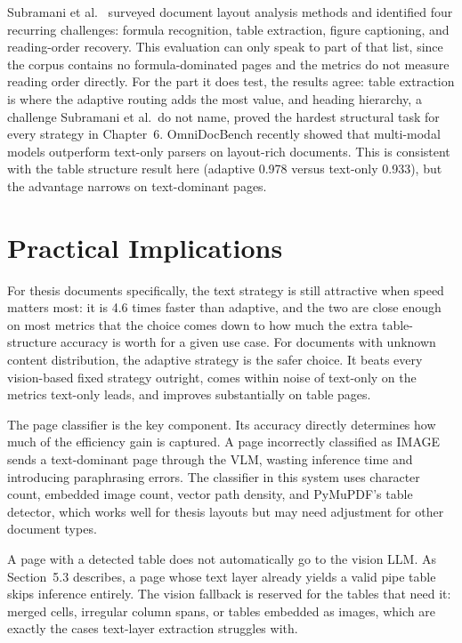 Subramani et al.\ \autocite{subramani2020} surveyed document layout
analysis methods and identified four recurring challenges: formula
recognition, table extraction, figure captioning, and reading-order
recovery. This evaluation can only speak to part of that list, since the
corpus contains no formula-dominated pages and the metrics do not measure
reading order directly. For the part it does test, the results agree:
table extraction is where the adaptive routing adds the most value, and
heading hierarchy, a challenge Subramani et al.\ do not name, proved the
hardest structural task for every strategy in Chapter~6.
OmniDocBench \autocite{omnidocbench2025} recently showed that multi-modal
models outperform text-only parsers on layout-rich documents. This is
consistent with the table structure result here (adaptive 0.978 versus
text-only 0.933), but the advantage narrows on text-dominant pages.

\section{Practical Implications}
\label{sec:practical_implications}

For thesis documents specifically, the text strategy is still attractive
when speed matters most: it is 4.6 times faster than adaptive, and the two
are close enough on most metrics that the choice comes down to how much the
extra table-structure accuracy is worth for a given use case. For documents
with unknown content distribution, the adaptive strategy is the safer
choice. It beats every vision-based fixed strategy outright, comes within
noise of text-only on the metrics text-only leads, and improves
substantially on table pages.

The page classifier is the key component. Its accuracy directly
determines how much of the efficiency gain is captured. A page
incorrectly classified as IMAGE sends a text-dominant page through the
VLM, wasting inference time and introducing paraphrasing errors. The
classifier in this system uses character count, embedded image count,
vector path density, and PyMuPDF's table detector, which works well for
thesis layouts but may need adjustment for other document types.

A page with a detected table does not automatically go to the vision LLM.
As Section~5.3 describes, a page whose text layer already yields a valid
pipe table skips inference entirely. The vision fallback is reserved for
the tables that need it: merged cells, irregular column spans, or tables
embedded as images, which are exactly the cases text-layer extraction
struggles with.

